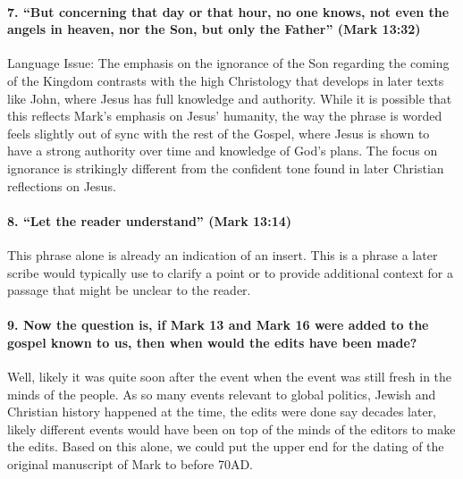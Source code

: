 \paragraph{7.
``But concerning that day or that hour, no one knows, not even the angels in heaven, nor the Son, but only the Father'' (Mark 13:32)}\label{par:but-concerning-that-day-or-that-hour-no-one-knows-not-even-the-angels-in-heaven-nor-the-son-but-only-the-father-mark-1332}

Language Issue: The emphasis on the ignorance of the Son regarding the coming of the Kingdom contrasts with the high Christology that develops in later texts like John, where Jesus has full knowledge and authority.
While it is possible that this reflects Mark's emphasis on Jesus' humanity, the way the phrase is worded feels slightly out of sync with the rest of the Gospel, where Jesus is shown to have a strong authority over time and knowledge of God's plans.
The focus on ignorance is strikingly different from the confident tone found in later Christian reflections on Jesus.

\paragraph{8.
``Let the reader understand'' (Mark 13:14)}\label{par:let-the-reader-understand-mark-1314}

This phrase alone is already an indication of an insert.
This is a phrase a later scribe would typically use to clarify a point or to provide additional context for a passage that might be unclear to the reader.

\paragraph{9.
Now the question is, if Mark 13 and Mark 16 were added to the gospel known to us, then when would the edits have been made?}\label{par:now-the-question-is-if-mark-13-and-mark-16-were-added-to-the-gospel-known-to-us-then-when-would-the-edits-have-been-made}

Well, likely it was quite soon after the event when the event was still fresh in the minds of the people.
As so many events relevant to global politics, Jewish and Christian history happened at the time, the edits were done say decades later, likely different events would have been on top of the minds of the editors to make the edits.
Based on this alone, we could put the upper end for the dating of the original manuscript of Mark to before 70AD.

